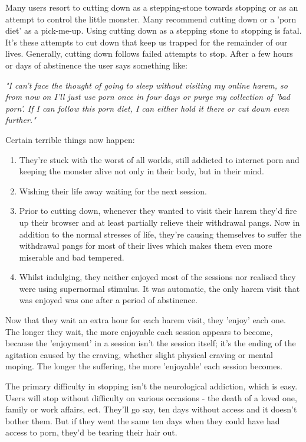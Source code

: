 \documentclass[easypeasy.tex]{subfiles}
\begin{document}
Many users resort to cutting down as a stepping-stone towards stopping or as an attempt to control the little monster. Many recommend cutting down or a 'porn diet' as a pick-me-up. Using cutting down as a stepping stone to stopping is fatal. It's these attempts to cut down that keep us trapped for the remainder of our lives. Generally, cutting down follows failed attempts to stop. After a few hours or days of abstinence the user says something like:

  \textit{"I can't face the thought of going to sleep without visiting my online harem, so from now on I'll just use porn once in four days or purge my collection of 'bad porn'. If I can follow this porn diet, I can either hold it there or cut down even further."}

Certain terrible things now happen:

 \begin{enumerate} 
  \item They're stuck with the worst of all worlds, still addicted to internet porn and keeping the monster alive not only in their body, but in their mind.

  \item Wishing their life away waiting for the next session.

  \item Prior to cutting down, whenever they wanted to visit their harem they'd fire up their browser and at least partially relieve their withdrawal pangs. Now in addition to the normal stresses of life, they're causing themselves to suffer the withdrawal pangs for most of their lives which makes them even more miserable and bad tempered.

  \item Whilst indulging, they neither enjoyed most of the sessions nor realised they were using supernormal stimulus. It was automatic, the only harem visit that was enjoyed was one after a period of abstinence.

\end{enumerate}
Now that they wait an extra hour for each harem visit, they 'enjoy' each one. The longer they wait, the more enjoyable each session appears to become, because the 'enjoyment' in a session isn't the session itself; it's the ending of the agitation caused by the craving, whether slight physical craving or mental moping. The longer the suffering, the more 'enjoyable' each session becomes.

The primary difficulty in stopping isn't the neurological addiction, which is easy. Users will stop without difficulty on various occasions - the death of a loved one, family or work affairs, ect. They'll go say, ten days without access and it doesn't bother them. But if they went the same ten days when they could have had access to porn, they'd be tearing their hair out.
\end{document}
